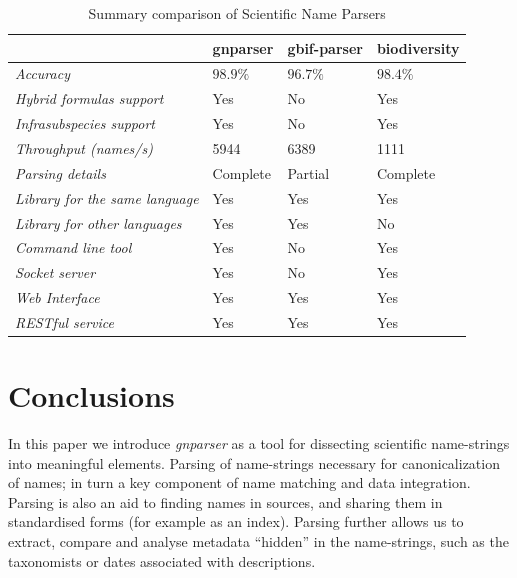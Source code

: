 \documentclass{bmcart}
\begin{document}
\begin{table}[htb]
  \begin{center}
    \caption{Summary comparison of Scientific Name Parsers}
    \label{table:summary}
    \resizebox{12.5cm}{!} {
    \begin{tabular}{|l|*{3}{l}|}
      \hline
                             & gnparser & gbif-parser & biodiversity \\
      \hline
      \textit{Accuracy}                     & $98.9\%$ & $96.7\%$ & $98.4\%$\\
      \textit{Hybrid formulas support}      & Yes      & No       & Yes     \\
      \textit{Infrasubspecies support}      & Yes      & No       & Yes     \\
      \textit{Throughput (names/s)}         & 5944     & 6389     & 1111    \\
      \textit{Parsing details}              & Complete & Partial  & Complete\\
      \textit{Library for the same language}& Yes      & Yes      & Yes     \\
      \textit{Library for other languages}  & Yes      & Yes      & No      \\
      \textit{Command line tool}            & Yes      & No       & Yes     \\
      \textit{Socket server}                & Yes      & No       & Yes     \\
      \textit{Web Interface}                & Yes      & Yes      & Yes     \\
      \textit{RESTful service}              & Yes      & Yes      & Yes     \\
      \hline
    \end{tabular}
  }
  \end{center}
\end{table}

\section*{Conclusions}

In this paper we introduce \textit{gnparser} as a tool for dissecting
scientific name-strings into meaningful elements. Parsing of name-strings
necessary for canonicalization of names; in turn a key component of name
matching and data integration. Parsing is  also an aid to finding names in
sources, and sharing them in standardised forms (for example as an index).
Parsing further allows us to extract, compare and analyse metadata ``hidden''
in the name-strings, such as the  taxonomists or dates associated with
descriptions.
\end{document}
